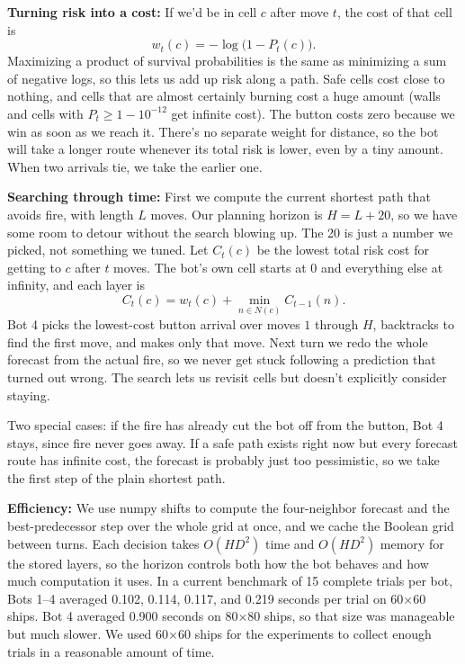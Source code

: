 \documentclass[11pt]{article}
\begin{document}
\textbf{Turning risk into a cost:} If we'd be in cell $c$ after move $t$, the cost of that cell is
\[
w_t(c) = -\log\bigl(1 - P_t(c)\bigr).
\]
Maximizing a product of survival probabilities is the same as minimizing a sum of negative logs, so this lets us add up risk along a path. Safe cells cost close to nothing, and cells that are almost certainly burning cost a huge amount (walls and cells with $P_t \ge 1 - 10^{-12}$ get infinite cost). The button costs zero because we win as soon as we reach it. There's no separate weight for distance, so the bot will take a longer route whenever its total risk is lower, even by a tiny amount. When two arrivals tie, we take the earlier one.

\textbf{Searching through time:} First we compute the current shortest path that avoids fire, with length $L$ moves. Our planning horizon is $H = L + 20$, so we have some room to detour without the search blowing up. The 20 is just a number we picked, not something we tuned. Let $C_t(c)$ be the lowest total risk cost for getting to $c$ after $t$ moves. The bot's own cell starts at 0 and everything else at infinity, and each layer is
\[
C_t(c) = w_t(c) + \min_{n \in N(c)} C_{t-1}(n).
\]
Bot 4 picks the lowest-cost button arrival over moves $1$ through $H$, backtracks to find the first move, and makes only that move. Next turn we redo the whole forecast from the actual fire, so we never get stuck following a prediction that turned out wrong. The search lets us revisit cells but doesn't explicitly consider staying.

Two special cases: if the fire has already cut the bot off from the button, Bot 4 stays, since fire never goes away. If a safe path exists right now but every forecast route has infinite cost, the forecast is probably just too pessimistic, so we take the first step of the plain shortest path.

\textbf{Efficiency:} We use numpy shifts to compute the four-neighbor forecast and the best-predecessor step over the whole grid at once, and we cache the Boolean grid between turns. Each decision takes $O(HD^2)$ time and $O(HD^2)$ memory for the stored layers, so the horizon controls both how the bot behaves and how much computation it uses. In a current benchmark of 15 complete trials per bot, Bots 1--4 averaged 0.102, 0.114, 0.117, and 0.219 seconds per trial on 60$\times$60 ships. Bot 4 averaged 0.900 seconds on 80$\times$80 ships, so that size was manageable but much slower. We used 60$\times$60 ships for the experiments to collect enough trials in a reasonable amount of time.
\end{document}
